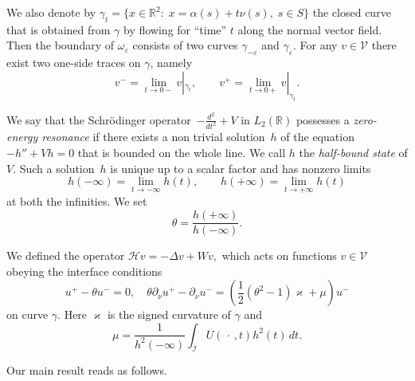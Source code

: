 \documentclass[reqno]{amsart}
\theoremstyle{plain}
\numberwithin{equation}{section}
\renewcommand{\kappa}{\varkappa}
\newcommand{\Real}{\mathbb R}
\newcommand{\eps}{\varepsilon}
\newcommand{\cI}{\mathcal{I}}
\renewcommand{\emph}[1]{{\textit{#1}}}
\begin{document}
We also denote by $\gamma_t=\{x\in\Real^2\colon\; x=\alpha(s)+t\nu(s), \; s\in S\}$ the closed curve that is obtained from $\gamma$ by flowing for ``time'' $t$ along the normal vector field. Then the boundary of $\omega_\eps$ consists of two curves $\gamma_{-\eps}$ and $\gamma_{\eps}$. For any $v\in \mathcal{V}$ there exist two one-side traces on $\gamma$, namely
\begin{equation}\label{UpmNotation}
  v^-=\lim_{t\to 0-}v|_{\gamma_{t}}, \qquad
v^+=\lim_{t\to 0+}v|_{\gamma_{t}}.
\end{equation}







We say that the Schr\"odinger operator~$-\frac{d^2}{d t^2}+V$ in $L_2(\Real)$ possesses a \emph{zero-energy resonance}  if there exists a non trivial solution~$h$ of the equation $-h'' +Vh= 0$ that is bounded on the whole line.  We call $h$ the \emph{half-bound state} of $V$.  Such a solution~$h$ is  unique up to a scalar factor and has nonzero limits
\begin{equation*}
  h(-\infty)=\lim\limits_{t\to-\infty}h(t), \qquad
  h(+\infty)=\lim\limits_{t\to+\infty}h(t)
\end{equation*}
at both the infinities. We set
\begin{equation}\label{Theta}
  \theta=\frac{h(+\infty)}{h(-\infty)}.
\end{equation}

We defined the operator
$
\mathcal{H} v=-\Delta v+Wv,
$
which acts on functions $v\in \mathcal{V}$  obeying the interface conditions
\begin{equation}\label{ConnectedCond}
 u^+-\theta u^-=0,\quad  \theta\partial_\nu u^+-\partial_\nu u^-
=\left(\textstyle\frac{1}{2 }(\theta^2-1)\kappa+\mu\right) u^-
\end{equation}
on curve $\gamma$. Here   $\kappa$ is the signed curvature of $\gamma$ and
\begin{equation}\label{Mu}
  \mu=\frac{1}{h^2(-\infty)} \int_{\cI} U(\,\cdot\,,t)h^2(t)\, dt.
\end{equation}


Our main result reads as follows.
\end{document}
